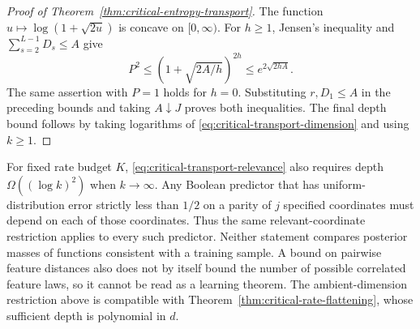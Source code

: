 \begin{proof}[Proof of Theorem~\ref{thm:critical-entropy-transport}]
The function $u\mapsto\log(1+\sqrt{2u})$ is concave on
$[0,\infty)$. For $h\ge1$, Jensen's inequality and
$\sum_{s=2}^{L-1}D_s\le A$ give
\[
 P^2\le(1+\sqrt{2A/h})^{2h}
       \le e^{2\sqrt{2hA}}.
\]
The same assertion with $P=1$ holds for $h=0$. Substituting
$r,D_1\le A$ in the preceding bounds and taking $A\downarrow J$
proves both inequalities. The final depth bound follows by taking
logarithms of \eqref{eq:critical-transport-dimension} and using $k\ge1$.
\end{proof}

\begin{remark}
For fixed rate budget $K$, \eqref{eq:critical-transport-relevance}
also requires depth $\Omega((\log k)^2)$ when $k\to\infty$.
Any Boolean predictor that has uniform-distribution error strictly less
than $1/2$ on a parity of $j$ specified coordinates must depend on each
of those coordinates. Thus the same relevant-coordinate restriction
applies to every such predictor. Neither statement compares posterior
masses of functions consistent with a training sample. A bound on
pairwise feature distances also does not by itself bound the number of
possible correlated feature laws, so it cannot be read as a learning
theorem. The ambient-dimension restriction above is compatible with
Theorem~\ref{thm:critical-rate-flattening}, whose sufficient depth is
polynomial in $d$.
\end{remark}
